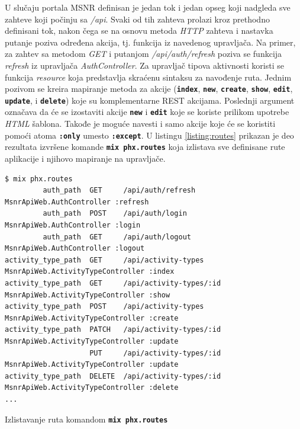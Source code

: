 \documentclass[12pt,oneside]{memoir}
\begin{document}
U slučaju portala MSNR definisan je jedan tok i jedan opseg koji nadgleda sve zahteve koji počinju sa \emph{/api}.
Svaki od tih zahteva prolazi kroz prethodno definisani tok, nakon čega se na osnovu metoda \emph{HTTP} zahteva i nastavka
putanje poziva određena akcija, tj. funkcija iz navedenog upravljača. Na primer, za zahtev sa metodom
\emph{GET} i putanjom \emph{/api/auth/refresh} poziva se funkcija \emph{refresh} iz upravljača 
\emph{AuthController}. Za upravljač tipova aktivnosti koristi se funkcija \emph{resource} koja
predstavlja skraćenu sintaksu za navođenje ruta. Jednim pozivom se kreira mapiranje metoda za akcije
(\texttt{\textbf{index}}, \texttt{\textbf{new}}, \texttt{\textbf{create}}, \texttt{\textbf{show}}, \texttt{\textbf{edit}},
\texttt{\textbf{update}}, i \texttt{\textbf{delete}}) koje su komplementarne REST akcijama. Poslednji argument označava da
će se izostaviti akcije \texttt{\textbf{new}} i \texttt{\textbf{edit}} koje se koriste prilikom upotrebe \emph{HTML} šablona. Takođe je moguće
navesti i samo akcije koje će se koristiti pomoći atoma \texttt{\textbf{:only}} umesto \texttt{\textbf{:except}}. U listingu \ref{listing:routes}
prikazan je deo rezultata izvršene komande \texttt{\textbf{mix phx.routes}} koja izlistava sve definisane rute aplikacije i njihovo mapiranje na upravljače.
\begin{listing}[!h]
  \begin{verbatim}
$ mix phx.routes
         auth_path  GET     /api/auth/refresh        MsnrApiWeb.AuthController :refresh
         auth_path  POST    /api/auth/login          MsnrApiWeb.AuthController :login
         auth_path  GET     /api/auth/logout         MsnrApiWeb.AuthController :logout
activity_type_path  GET     /api/activity-types      MsnrApiWeb.ActivityTypeController :index
activity_type_path  GET     /api/activity-types/:id  MsnrApiWeb.ActivityTypeController :show
activity_type_path  POST    /api/activity-types      MsnrApiWeb.ActivityTypeController :create
activity_type_path  PATCH   /api/activity-types/:id  MsnrApiWeb.ActivityTypeController :update
                    PUT     /api/activity-types/:id  MsnrApiWeb.ActivityTypeController :update
activity_type_path  DELETE  /api/activity-types/:id  MsnrApiWeb.ActivityTypeController :delete
...
\end{verbatim}
\caption{Izlistavanje ruta komandom \texttt{\textbf{mix phx.routes}}}
\label{listing:routes}
\end{listing}
\end{document}

